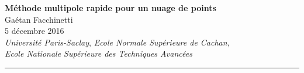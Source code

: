 \documentclass[10pt]{article}
\begin{document}
\vspace*{-22pt}
\begin{center}
\textbf{\Large Méthode multipole rapide pour un nuage de points}\\
\vspace*{4pt}
Gaétan Facchinetti \\
{\small 5 décembre 2016\\
\vspace*{5pt}
\textit{Université Paris-Saclay}, \textit{Ecole Normale Supérieure de Cachan}}, \\
\textit{Ecole Nationale Supérieure des Techniques Avancées}\\
\end{center}


\begin{center}
\rule{10cm}{1pt}
\end{center}

\end{document}
